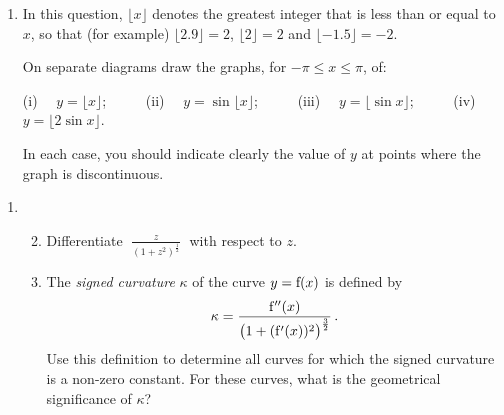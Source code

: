 \documentclass[a4, 11pt]{report}
\newlength{\qspace}
\newcounter{qnumber}
\newenvironment{question}%
 {\vspace{\qspace}
  \begin{enumerate}[\bfseries 1\quad][10]%
    \setcounter{enumi}{\value{qnumber}}%
    \item%
 }
{
  \end{enumerate}
  \filbreak
  \stepcounter{qnumber}
 }
\newenvironment{questionparts}[1][1]%
 {
  \begin{enumerate}[\bfseries (i)]%
    \setcounter{enumii}{#1}
    \addtocounter{enumii}{-1}
    \setlength{\itemsep}{5mm}
    \setlength{\parskip}{8pt}
 }
 {
  \end{enumerate}
 }
\def\f{{\rm f}}
\def\le{\leqslant}
\begin{document}


\begin{question}
In this question, $\lfloor x \rfloor$ denotes the greatest integer
that  is less than or equal to $x$, so that (for example)
$\lfloor 2.9 \rfloor = 2$,  $\lfloor 2\rfloor = 2$
and
 $\lfloor -1.5 \rfloor = -2$.

On separate diagrams draw the graphs, for $-\pi \le x \le \pi$, of:
\begin{center}
(i) \ \  $y = \lfloor x \rfloor$; \ \ \ \ \ 
(ii) \ \ $y=\sin\lfloor x \rfloor$; \ \ \ \ \ 
(iii) \ \ $y = \lfloor \sin x\rfloor$; \ \ \ \ \ 
(iv) \ \ $y= \lfloor 2\sin x\rfloor$. 
\end{center}
In each case,
you should indicate clearly the value of $y$ at points where the graph
is discontinuous.  

\end{question}

\begin{question}
\begin{questionparts}
\item Differentiate
$\displaystyle
\;
\frac z {(1+z^2)^{\frac12}}
\;$
with respect to $z$.


\item 
The {\em signed curvature} $\kappa$ of the  curve $y=\f(x)$ is 
defined by
\[
\kappa = \frac {\f''(x)}{\big({1+ (\f'(x))^2\big)^{\frac32}}} 
\,.\]
Use this definition to  
determine all curves for which the signed curvature
is a non-zero constant. For these
curves, what is the geometrical significance of $\kappa$?
\end{questionparts}

\end{question}
\end{document}
